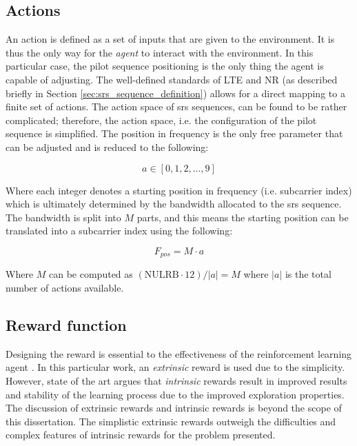 \subsection{Actions}
An action is defined as a set of inputs that are given to the environment. It is thus the only way for the \emph{agent} to interact with the environment. In this particular case, the pilot sequence positioning is the only thing the agent is capable of adjusting. The well-defined standards of LTE and NR (as described briefly in Section \ref{sec:srs_sequence_definition}) allows for a direct mapping to a finite set of actions. The action space of \gls{srs} sequences, can be found to be rather complicated; therefore, the action space, i.e. the configuration of the pilot sequence is simplified. The position in frequency is the only free parameter that can be adjusted and is reduced to the following: 

\begin{equation}
   a \in [0, 1, 2, ..., 9]
\end{equation}

Where each integer denotes a starting position in frequency (i.e. subcarrier index) which is ultimately determined by the bandwidth allocated to the \gls{srs} sequence. The bandwidth is split into $M$ parts, and this means the starting position can be translated into a subcarrier index using the following:

\begin{equation}
    F_{pos} = M \cdot a
\end{equation}

Where $M$ can be computed as $(\text{NULRB} \cdot 12) / |a| = M$ where $|a|$ is the total number of actions available. 

\subsection{Reward function}

Designing the reward is essential to the effectiveness of the reinforcement learning agent \cite{Sutton2017ReinforcementSecond}. In this particular work, an \emph{extrinsic} reward is used due to the simplicity. However, state of the art argues that \emph{intrinsic} rewards result in improved results and stability of the learning process \cite{SinghIntrinsicallyLearning} due to the improved exploration properties. The discussion of extrinsic rewards and intrinsic rewards is beyond the scope of this dissertation. The simplistic extrinsic rewards outweigh the difficulties and complex features of intrinsic rewards for the problem presented. 

